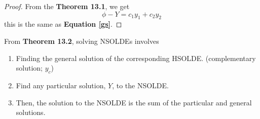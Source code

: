 \documentclass[diffeq.tex]{subfiles}
\begin{document}
    \begin{proof}
        From the \textbf{Theorem 13.1}, we get
        \begin{equation}
            \phi - Y = c_{1}y_{1} + c_{2}y_{2}
        \end{equation}
        this is the same as \textbf{Equation \ref{gs}}.
    \end{proof}
    From \textbf{Theorem  13.2}, solving NSOLDEs involves
    \begin{enumerate}
        \item Finding the general solution of the corresponding HSOLDE. (complementary solution; $y_c$)
        \item Find any particular solution, $Y$, to the NSOLDE.
        \item Then, the solution to the NSOLDE is the sum of the particular and general solutions.
    \end{enumerate}
    \np
\end{document}
